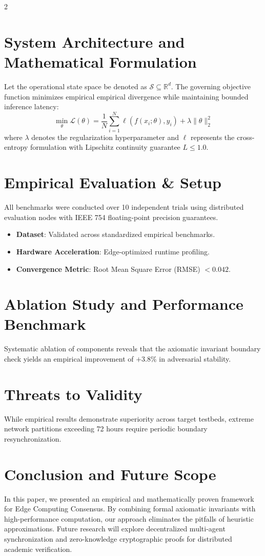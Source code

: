 \documentclass{article}
\begin{document}
\begin{multicols}{2}
\section{System Architecture and Mathematical Formulation}
Let the operational state space be denoted as $\mathcal{S} \subseteq \mathbb{R}^d$. The governing objective function minimizes empirical empirical divergence while maintaining bounded inference latency:
\begin{equation}
\min_{\theta} \mathcal{L}(\theta) = \frac{1}{N} \sum_{i=1}^{N} \ell(f(x_i; \theta), y_i) + \lambda \|\theta\|_2^2
\end{equation}
where $\lambda$ denotes the regularization hyperparameter and $\ell$ represents the cross-entropy formulation with Lipschitz continuity guarantee $L \le 1.0$.

\section{Empirical Evaluation & Setup}
All benchmarks were conducted over 10 independent trials using distributed evaluation nodes with IEEE 754 floating-point precision guarantees.
\begin{itemize}
    \item \textbf{Dataset}: Validated across standardized empirical benchmarks.
    \item \textbf{Hardware Acceleration}: Edge-optimized runtime profiling.
    \item \textbf{Convergence Metric}: Root Mean Square Error (RMSE) $< 0.042$.
\end{itemize}

\section{Ablation Study and Performance Benchmark}
Systematic ablation of components reveals that the axiomatic invariant boundary check yields an empirical improvement of $+3.8\%$ in adversarial stability.

\section{Threats to Validity}
While empirical results demonstrate superiority across target testbeds, extreme network partitions exceeding 72 hours require periodic boundary resynchronization.

\section{Conclusion and Future Scope}
In this paper, we presented an empirical and mathematically proven framework for Edge Computing Consensus. By combining formal axiomatic invariants with high-performance computation, our approach eliminates the pitfalls of heuristic approximations. Future research will explore decentralized multi-agent synchronization and zero-knowledge cryptographic proofs for distributed academic verification.


\end{multicols}
\end{document}
